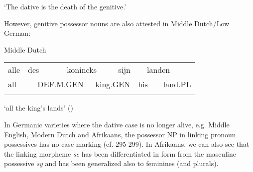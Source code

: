 \begin{styleTranslation}
 ‘The dative is the death of the genitive.’

\end{styleTranslation}

\begin{styleBodyTextFirst}
 However, genitive possessor nouns are also attested in Middle Dutch/Low German:

\end{styleBodyTextFirst}

\begin{listWWNumileveli}
\item 

\begin{styleExample}
Middle Dutch

\end{styleExample}

\end{listWWNumileveli}

\begin{tabular}{llllllllll}
\lsptoprule
alle & \multicolumn{2}{l}{des

} & \multicolumn{2}{l}{konincks

} & \multicolumn{2}{l}{sijn

} & \multicolumn{2}{l}{landen

} & \\
\multicolumn{2}{l}{all

} & \multicolumn{2}{l}{DEF.M.GEN

} & \multicolumn{2}{l}{king.GEN

} & \multicolumn{2}{l}{his

} & \multicolumn{2}{l}{land.PL

}\\
\lspbottomrule
\end{tabular}

\begin{styleTranslation}
‘all the king’s lands’ (\citet[58]{Norde1997})

\end{styleTranslation}

\begin{styleBodyTextFirst}
In Germanic varieties where the dative case is no longer alive, e.g. Middle English, Modern Dutch and Afrikaans, the possessor NP in linking pronoun possessives has no case marking (cf. 295{}-299). In Afrikaans, we can also see that the linking morpheme \textit{se} has been differentiated in form from the masculine possessive \textit{sy} and has been generalized also to feminines (and plurals).

\end{styleBodyTextFirst}

